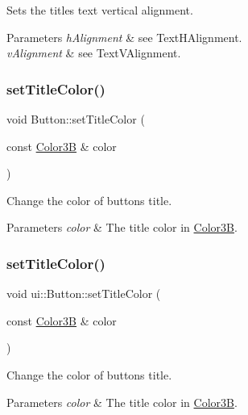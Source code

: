 Sets the title\textquotesingle{}s text vertical alignment.


\begin{DoxyParams}{Parameters}
{\em h\+Alignment} & see Text\+H\+Alignment. \\
\hline
{\em v\+Alignment} & see Text\+V\+Alignment. \\
\hline
\end{DoxyParams}
\mbox{\label{classui_1_1Button_aaf0d3323454eb3b365e37c62fb87793c}} 
\subsubsection{\texorpdfstring{set\+Title\+Color()}{setTitleColor()}\hspace{0.1cm}{\footnotesize\ttfamily [1/2]}}
{\footnotesize\ttfamily void Button\+::set\+Title\+Color (\begin{DoxyParamCaption}\item[{const \hyperlink{structColor3B}{Color3B} \&}]{color }\end{DoxyParamCaption})}

Change the color of button\textquotesingle{}s title. 
\begin{DoxyParams}{Parameters}
{\em color} & The title color in \hyperlink{structColor3B}{Color3B}. \\
\hline
\end{DoxyParams}
\mbox{\label{classui_1_1Button_a71b31510a3f3c3873bfe7db5fa4e72df}} 
\subsubsection{\texorpdfstring{set\+Title\+Color()}{setTitleColor()}\hspace{0.1cm}{\footnotesize\ttfamily [2/2]}}
{\footnotesize\ttfamily void ui\+::\+Button\+::set\+Title\+Color (\begin{DoxyParamCaption}\item[{const \hyperlink{structColor3B}{Color3B} \&}]{color }\end{DoxyParamCaption})}

Change the color of button\textquotesingle{}s title. 
\begin{DoxyParams}{Parameters}
{\em color} & The title color in \hyperlink{structColor3B}{Color3B}. \\
\hline
\end{DoxyParams}
\mbox{\label{classui_1_1Button_ab92d652e5a69eacacd132f549c32f86d}} 
